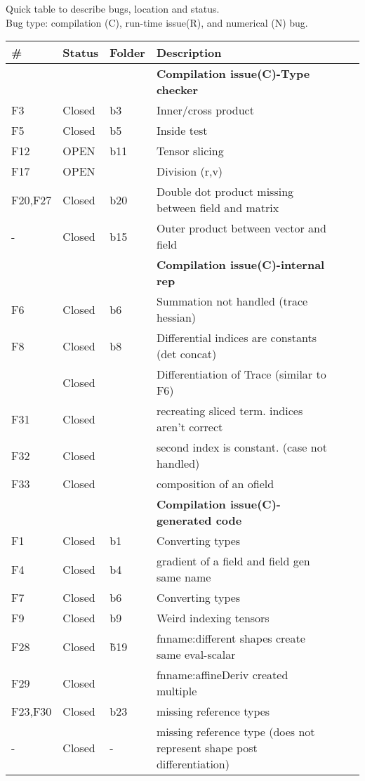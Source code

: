 \documentclass{article}
\begin{document}
Quick table to describe bugs, location and status.\\
Bug type:  compilation (C), run-time issue(R), and numerical (N) bug.\\



\begin{tabular}{|l|ll|lll|}
\hline
\# & Status & Folder & Description \\
\hline
\hline
&&& \textbf{Compilation issue(C)-Type checker}\\
\hline
 F3 &Closed&b3  & Inner/cross product  \\
 F5 &Closed&b5& Inside test\\
  F12 &OPEN & b11 & Tensor slicing\\
F17 &OPEN &   & Division (r,v)\\
  F20,F27 &Closed &  b20 & Double dot product missing between field and matrix\\
- &  Closed & b15 & Outer product between vector and field \\
  \hline
  \hline
   &&& \textbf{Compilation issue(C)-internal rep}\\
     \hline
   F6 &Closed &b6  & Summation not handled (trace hessian) \\
     F8 &Closed &b8 &Differential indices are constants (det concat)\\
   & Closed  & &Differentiation of Trace (similar to F6)\\
  F31 & Closed & & recreating sliced term. indices aren't correct\\
   F32 & Closed & & second index is  constant. (case not handled)\\
   F33 & Closed && composition of an ofield\\
  \hline
  \hline 
 &&& \textbf{Compilation issue(C)-generated code}\\
 \hline
 F1 &Closed& b1& Converting types\\
  F4 &Closed&b4 & gradient of a field and  field gen same name\\
  F7 &Closed& b6  & Converting types\\
F9 &Closed&b9 & Weird indexing tensors\\
 F28 & Closed & \~ b19 & fnname:different shapes create same eval-scalar\\
  F29 & Closed && fnname:affineDeriv created multiple\\
    F23,F30 & Closed &b23& missing reference types\\
    - & Closed & - & missing reference type (does not represent shape post differentiation)\\

\end{tabular}
\end{document}
